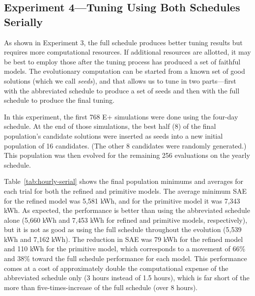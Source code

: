\documentclass[preprint, review, 12pt]{elsarticle}
\begin{document}
\subsection{Experiment 4---Tuning Using Both Schedules Serially}
\label{sub:experiment4}
As shown in Experiment 3, the full schedule produces better tuning results but requires more computational resources. If additional resources are allotted, it may be best to employ those after the tuning process has produced a set of faithful models. The evolutionary computation can be started from a known set of good solutions (which we call \emph{seeds}), and that allows us to tune in two parts---first with the abbreviated schedule to produce a set of seeds and then with the full schedule to produce the final tuning.

In this experiment, the first 768 E+ simulations were done using the four-day schedule. At the end of those simulations, the best half (8) of the final population's candidate solutions were inserted as seeds into a new initial population of 16 candidates. (The other 8 candidates were randomly generated.) This population was then evolved for the remaining 256 evaluations on the yearly schedule.

Table~\ref{tab:hourly-serial} shows the final population minimums and averages for each trial for both the refined and primitive models. The average minimum SAE for the refined model was 5,581 kWh, and for the primitive model it was 7,343 kWh. As expected, the performance is better than using the abbreviated schedule alone (5,660 kWh and 7,453 kWh for refined and primitive models, respectively), but it is not as good as using the full schedule throughout the evolution (5,539 kWh and 7,162 kWh). The reduction in SAE was 79 kWh for the refined model and 110 kWh for the primitive model, which corresponds to a movement of 66\% and 38\% toward the full schedule performance for each model. This performance comes at a cost of approximately double the computational expense of the abbreviated schedule only (3 hours instead of 1.5 hours), which is far short of the more than five-times-increase of the full schedule (over 8 hours). 
\end{document}
